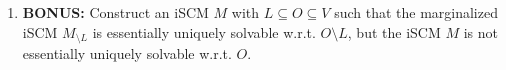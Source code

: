 \begin{enumerate}[label=10.\arabic*]
    \item \textbf{BONUS:} Construct an iSCM $M$ with $L\subseteq O\subseteq V$ such that the marginalized iSCM $M_{\setminus L}$ is essentially uniquely solvable w.r.t. $O \setminus L$, but the iSCM $M$ is not essentially uniquely solvable w.r.t. $O$.
\end{enumerate}


